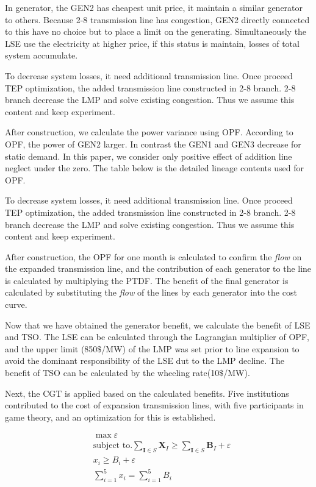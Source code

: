 \documentclass[journal]{IEEEtran} %
\begin{document}
In generator, the GEN2 has cheapest unit price, it maintain a similar generator to others. Because 2-8 transmission line has congestion, GEN2 directly connected to this have no choice but to place a limit on the generating. Simultaneously the LSE use the electricity at higher price, if this status is maintain, losses of total system accumulate.

To decrease system losses, it need additional transmission line. Once proceed TEP optimization, the added transmission line constructed in 2-8 branch. 2-8 branch decrease the LMP and  solve existing congestion. Thus we assume this content and keep experiment.
 
After construction, we calculate the power variance using OPF. According to OPF, the power of GEN2 larger. In contrast the GEN1 and GEN3 decrease for static demand. In this paper, we consider only positive effect of addition line neglect under the zero. The table below is the detailed lineage contents used for OPF.



To decrease system losses, it need additional transmission line. Once proceed TEP optimization, the added transmission line constructed in 2-8 branch. 2-8 branch decrease the LMP and  solve existing congestion. Thus we assume this content and keep experiment.
 
After construction, the OPF for one month is calculated to confirm the \textit{flow} on the expanded transmission line, and the contribution of each generator to the line is calculated by multiplying the PTDF. The benefit of the final generator is calculated by substituting the \textit{flow} of the lines by each generator into the cost curve.

Now that we have obtained the generator benefit, we calculate the benefit of LSE and TSO. The LSE can be calculated through the Lagrangian multiplier of OPF, and the upper limit (850$ \$ $/MW) of the LMP was set prior to line expansion to avoid the dominant responsibility of the LSE dut to the LMP decline. The benefit of TSO can be calculated by the wheeling rate(10$ \$ $/MW). 

Next, the CGT is applied based on the calculated benefits. Five institutions contributed to the cost of expansion transmission lines, with five participants in game theory, and an optimization for this is established.


\begin{align}
&\max \varepsilon \nonumber \\
&\textrm{subject to.} \sum\limits_{\textbf{I} \in S} {\textbf{X}_{I}} \geq \sum\limits_{\textbf{I} \in S} \textbf{B}_{I} + \varepsilon \nonumber \\
&\textit{x}_{i} \geq B_{i} + \varepsilon\\
&\sum\limits_{i=1}^{5} x_{i} = \sum\limits_{i=1}^{5} B_{i} \nonumber
\end{align}
\end{document}
